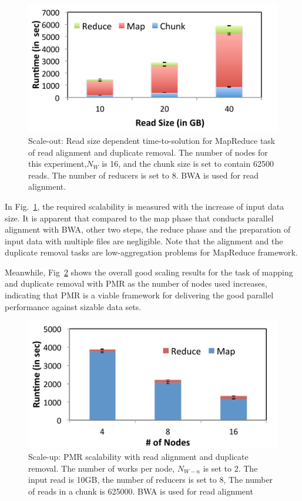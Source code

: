 \documentclass{sig-alternate}
\begin{document}
 \begin{figure}
 \centering
\includegraphics[scale=0.50]{figures/pj-smr-tts.pdf} 
\caption{\small Scale-out: Read size dependent time-to-solution for MapReduce task of read alignment and duplicate removal.  The number of nodes for this experiment,$N_W$ is 16, and the chunk size is set to contain 62500 reads.  The number of reducers is set to 8. BWA is used for read alignment.}
  \label{fig:read-size} 
\end{figure}

In Fig.~\ref{fig:read-size}, the required scalability is measured with the increase of input data size.  It is apparent that compared to the map phase that conducts parallel alignment with BWA, other two steps, the reduce phase and the preparation of input data with multiple files are negligible.  Note that the alignment and the duplicate removal tasks are low-aggregation problems for MapReduce framework.  

Meanwhile, Fig~\ref{fig:scale-p-saga-mr} shows the overall good scaling results for the task of mapping and duplicate removal with PMR as the number of nodes used increases, indicating that PMR is a viable framework for delivering the good parallel performance against sizable data sets.





\begin{figure}
 \centering
\includegraphics[scale=0.50]{figures/pj-smr-scale.pdf}
\caption{\small Scale-up: PMR scalability with read alignment and duplicate removal.  The number of works per node, $N_{W-n}$ is set to 2.   The input read is 10GB, the number of reducers is set to 8, The number of reads in a chunk is 625000. BWA is used for read alignment}
  \label{fig:scale-p-saga-mr} 
\end{figure}
\end{document}
